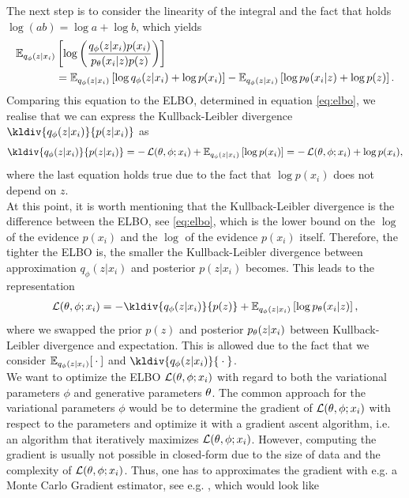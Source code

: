 The next step is to consider the linearity of the integral and the fact that holds $\log (ab) = \log a +\log b$, which yields
\begin{align*}
\operatorname{\mathbb{E}}_{q_{\phi}(z|x_i)} &\left[ \log \left( \frac{q_{\phi}(z|x_i)p(x_i)}{p_{\theta}(x_i| z)p(z)} \right) \right]\\
&= \operatorname{\mathbb{E}}_{q_{\phi}(z|x_i)} \left[ \log q_{\phi}(z|x_i) + \log p(x_i)  \right] - \operatorname{\mathbb{E}}_{q_{\phi}(z|x_i)} \left[ \log p_{\theta}(x_i| z) + \log p(z)\right].
\end{align*}
Comparing this equation to the ELBO, determined in equation \eqref{eq:elbo}, we realise that we can express the Kullback-Leibler divergence $\kldiv{q_{\phi}(z|x_i)}{p(z|x_i)}$ as
\begin{align*}
\kldiv{q_{\phi}(z|x_i)}{p(z|x_i)} = - \loss(\t, \phi; x_i) + \E_{q_{\phi}(z|x_i)} \left[ \log p(x_i) \right] = - \loss(\t, \phi; x_i) + \log p(x_i),
\end{align*}
where the last equation holds true due to the fact that $\log p(x_i)$ does not depend on $z$.\\
At this point, it is worth mentioning that the Kullback-Leibler divergence is the difference between the ELBO, see \eqref{eq:elbo}, which is the lower bound on the $\log$ of the evidence $p(x_i)$ and the $\log$ of the evidence $p(x_i)$ itself. Therefore, the tighter the ELBO is, the smaller the Kullback-Leibler divergence between approximation $q_{\phi}(z|x_i)$ and posterior $p(z|x_i)$ becomes. This leads to the representation
\begin{align}\label{eq:alternative_loss}
\loss(\t,\phi ; x_i) = - \kldiv{q_{\phi}(z|x_i)}{p(z)} + \E_{q_{\phi}(z|x_i)} \left[ \log p_{\t}(x_i|z) \right],
\end{align}
where we swapped the prior $p(z)$ and posterior $p_{\theta}(z|x_i)$ between Kullback-Leibler divergence and expectation. This is allowed due to the fact that we consider $\operatorname{\mathbb{E}}_{q_{\phi}(z|x_i)}[{}\cdot{}]$ and $\kldiv{q_{\phi}(z|x_i)}{\wc}$.\\
We want to optimize the ELBO $\operatorname{\mathcal{L}}(\theta,\phi ; x_i)$ with regard to both the variational parameters $\phi$ and generative parameters $\theta$. The common approach for the variational parameters $\phi$ would be to determine the gradient of $\operatorname{\mathcal{L}}(\theta,\phi ; x_i)$ with respect to the parameters and optimize it with a gradient ascent algorithm, i.e. an algorithm that iteratively maximizes $\operatorname{\mathcal{L}}(\theta,\phi ; x_i)$. However, computing the gradient is usually not possible in closed-form due to the size of data and the complexity of $\operatorname{\mathcal{L}}(\theta,\phi ; x_i) $. Thus, one has to approximates the gradient with e.g. a Monte Carlo Gradient estimator, see e.g. \cite[Section~11.1.6]{bishop2006pattern}, which would look like
